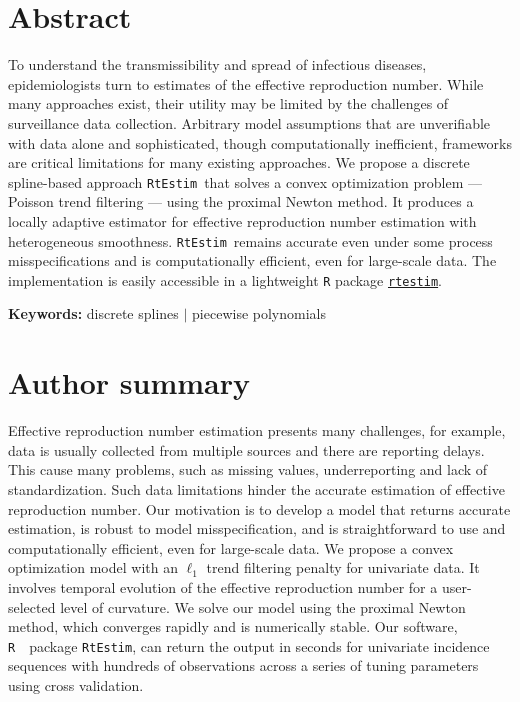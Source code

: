 \documentclass[10pt,letterpaper]{article}
\newcommand{\R}{\texttt{R}\ }
\def\RtEstim{\texttt{RtEstim}}
\begin{document}
\section*{Abstract}

To understand the transmissibility and spread of infectious diseases,
epidemiologists turn to estimates of the effective reproduction number.
While many approaches exist, their utility may be limited by the
challenges of surveillance data collection. Arbitrary model assumptions
that are unverifiable with data alone and sophisticated, though
computationally inefficient, frameworks are critical limitations for many
existing approaches. We propose a discrete spline-based approach 
\RtEstim\ that solves a convex optimization problem --- Poisson trend filtering
--- using the proximal Newton method. It produces a locally adaptive 
estimator for effective reproduction number estimation with heterogeneous 
smoothness. \RtEstim\ remains accurate even under some process 
misspecifications and is computationally efficient, even for large-scale 
data. The implementation is easily accessible in a lightweight \texttt{R} 
package \href{https://dajmcdon.github.io/rtestim/index.html}{\texttt{rtestim}}.

{\bf Keywords:} discrete splines $|$ piecewise polynomials

\section*{Author summary}

Effective reproduction number estimation presents many challenges, for example, 
data is usually collected from multiple sources and there are reporting delays. 
This cause many problems, such as missing values, underreporting and lack of 
standardization. Such data limitations hinder the accurate estimation of effective 
reproduction number. Our motivation is to develop a model that returns accurate 
estimation, is robust to model misspecification, and is straightforward to use 
and computationally efficient, even for large-scale data. We propose a convex 
optimization model with an $\ell_1$ trend filtering penalty for univariate data. 
It involves temporal evolution of the effective reproduction number for a 
user-selected level of curvature. We solve our model using the proximal Newton 
method, which converges rapidly and is numerically stable. Our software, \R\ 
package \RtEstim, can return the output in seconds for univariate incidence 
sequences with hundreds of observations across a series of tuning parameters 
using cross validation. 
\end{document}

